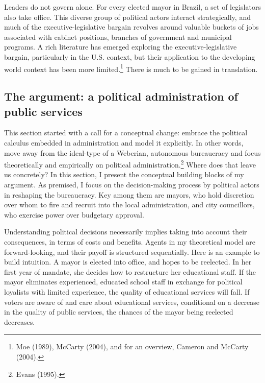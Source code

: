 \documentclass[12pt,]{article}
\let\rmarkdownfootnote\footnote%
\def\footnote{\protect\rmarkdownfootnote}
\begin{document}
Leaders do not govern alone. For every elected mayor in Brazil, a set of
legislators also take office. This diverse group of political actors
interact strategically, and much of the executive-legislative bargain
revolves around valuable buckets of jobs associated with cabinet
positions, branches of government and municipal programs. A rich
literature has emerged exploring the executive-legislative bargain,
particularly in the U.S. context, but their application to the
developing world context has been more limited.\footnote{Moe (1989),
  McCarty (2004), and for an overview, Cameron and McCarty (2004).}
There is much to be gained in translation.

\hypertarget{the-argument-a-political-administration-of-public-services}{%
\subsection{The argument: a political administration of public
services}\label{the-argument-a-political-administration-of-public-services}}

This section started with a call for a conceptual change: embrace the
political calculus embedded in administration and model it explicitly.
In other words, move away from the ideal-type of a Weberian, autonomous
bureaucracy and focus theoretically and empirically on political
administration.\footnote{Evans (1995).} Where does that leave us
concretely? In this section, I present the conceptual building blocks of
my argument. As premised, I focus on the decision-making process by
political actors in reshaping the bureaucracy. Key among them are
mayors, who hold discretion over whom to fire and recruit into the local
administration, and city councillors, who exercise power over budgetary
approval.

Understanding political decisions necessarily implies taking into
account their consequences, in terms of costs and benefits. Agents in my
theoretical model are forward-looking, and their payoff is structured
sequentially. Here is an example to build intuition. A mayor is elected
into office, and hopes to be reelected. In her first year of mandate,
she decides how to restructure her educational staff. If the mayor
eliminates experienced, educated school staff in exchange for political
loyalists with limited experience, the quality of educational services
will fall. If voters are aware of and care about educational services,
conditional on a decrease in the quality of public services, the chances
of the mayor being reelected decreases.
\end{document}
